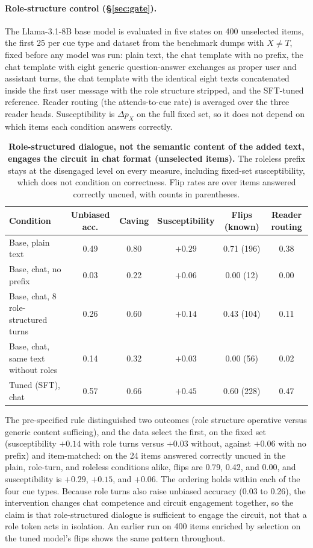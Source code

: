 \documentclass{article}
\begin{document}
\paragraph{Role-structure control (\S\ref{sec:gate}).} The Llama-3.1-8B base model is evaluated in five states on 400 unselected items, the first 25 per cue type and dataset from the benchmark dumps with $X \neq T$, fixed before any model was run: plain text, the chat template with no prefix, the chat template with eight generic question-answer exchanges as proper user and assistant turns, the chat template with the identical eight texts concatenated inside the first user message with the role structure stripped, and the SFT-tuned reference. Reader routing (the attends-to-cue rate) is averaged over the three reader heads. Susceptibility is $\Delta p_X$ on the full fixed set, so it does not depend on which items each condition answers correctly.

\begin{table}[h]
\centering
\small
\setlength{\tabcolsep}{3.5pt}
\begin{tabular}{lccccc}
\toprule
Condition & Unbiased acc. & Caving & Susceptibility & Flips (known) & Reader routing \\
\midrule
Base, plain text & 0.49 & 0.80 & $+0.29$ & 0.71 \; (196) & 0.38 \\
Base, chat, no prefix & 0.03 & 0.22 & $+0.06$ & 0.00 \; (12) & 0.00 \\
Base, chat, 8 role-structured turns & 0.26 & 0.60 & $+0.14$ & 0.43 \; (104) & 0.11 \\
Base, chat, same text without roles & 0.14 & 0.32 & $+0.03$ & 0.00 \; (56) & 0.02 \\
Tuned (SFT), chat & 0.57 & 0.66 & $+0.45$ & 0.60 \; (228) & 0.47 \\
\bottomrule
\end{tabular}
\caption{\textbf{Role-structured dialogue, not the semantic content of the added text, engages the circuit in chat format (unselected items).} The roleless prefix stays at the disengaged level on every measure, including fixed-set susceptibility, which does not condition on correctness. Flip rates are over items answered correctly uncued, with counts in parentheses.}
\label{tab:rolectl}
\end{table}

The pre-specified rule distinguished two outcomes (role structure operative versus generic content sufficing), and the data select the first, on the fixed set (susceptibility $+0.14$ with role turns versus $+0.03$ without, against $+0.06$ with no prefix) and item-matched: on the 24 items answered correctly uncued in the plain, role-turn, and roleless conditions alike, flips are 0.79, 0.42, and 0.00, and susceptibility is $+0.29$, $+0.15$, and $+0.06$. The ordering holds within each of the four cue types. Because role turns also raise unbiased accuracy (0.03 to 0.26), the intervention changes chat competence and circuit engagement together, so the claim is that role-structured dialogue is sufficient to engage the circuit, not that a role token acts in isolation. An earlier run on 400 items enriched by selection on the tuned model's flips shows the same pattern throughout.
\end{document}
